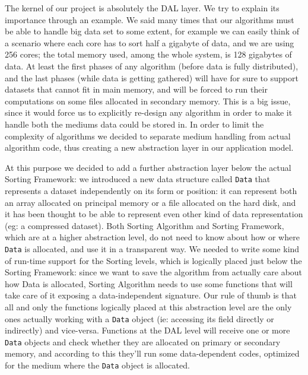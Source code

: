 \label{DAL}
The kernel of our project is absolutely the DAL layer. We try to explain its importance through an example. We said many times that our algorithms must be able to handle big data set to some extent, for example we can easily think of a scenario where each core has to sort half a gigabyte of data, and we are using 256 cores; the total memory used, among the whole system, is 128 gigabytes of data.
At least the first phases of any algorithm (before data is fully distributed), and the last phases (while data is getting gathered) will have for sure to support datasets that cannot fit in main memory, and will be forced to run their computations on some files allocated in secondary memory. 
This is a big issue, since it would force us to explicitly re-design any algorithm in order to make it handle both the mediums data could be stored in.
In order to limit the complexity of algorithms we decided to separate medium handling from actual algorithm code, thus creating a new abstraction layer in our application model.

At this purpose we decided to add a further abstraction layer below the actual Sorting Framework: we introduced a new data structure called \texttt{Data} that represents a dataset independently on its form or position: it can represent both an array allocated on principal memory or a file allocated on the hard disk, and it has been thought to be able to represent even other kind of data representation (eg: a compressed dataset). Both Sorting Algorithm and Sorting Framework, which are at a higher abstraction level, do not need to know about how or where \texttt{Data} is allocated, and use it in a transparent way.
We needed to write some kind of run-time support for the Sorting levels, which is logically placed just below the Sorting Framework: since we want to save the algorithm from actually care about how Data is allocated, Sorting Algorithm needs to use some functions that will take care of it exposing a data-independent signature. Our rule of thumb is that all and only the functions logically placed at this abstraction level are the only ones actually working with a \texttt{Data} object (ie: accessing its field directly or indirectly) and vice-versa.
Functions at the DAL level will receive one or more \texttt{Data} objects and check whether they are allocated on primary or secondary memory, and according to this they'll run some data-dependent codes, optimized for the medium where the \texttt{Data} object is allocated. \\

